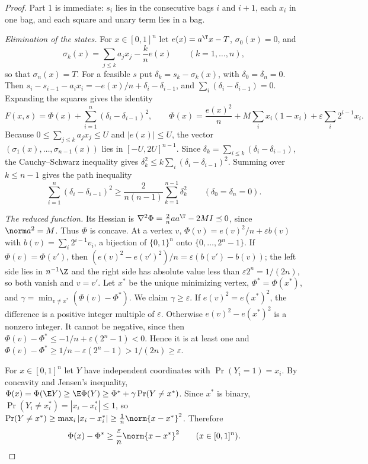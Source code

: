\begin{proof}
Part 1 is immediate: $s_i$ lies in the consecutive bags $i$ and $i+1$, each
$x_i$ in one bag, and each square and unary term lies in a bag.

\emph{Elimination of the states.} For $x\in[0,1]^n$ let
$e(x)=a^{\T}x-T$, $\sigma_0(x)=0$, and
\[
\sigma_k(x)=\sum_{j\le k}a_jx_j-\frac kne(x)\qquad(k=1,\ldots,n),
\]
so that $\sigma_n(x)=T$. For a feasible $s$ put $\delta_k=s_k-\sigma_k(x)$,
with $\delta_0=\delta_n=0$. Then
$s_i-s_{i-1}-a_ix_i=-e(x)/n+\delta_i-\delta_{i-1}$, and
$\sum_i(\delta_i-\delta_{i-1})=0$. Expanding the squares gives the identity
\begin{equation}\label{lim:eq:split}
F(x,s)=\Phi(x)+\sum_{i=1}^n(\delta_i-\delta_{i-1})^2,\qquad
\Phi(x)=\frac{e(x)^2}n+M\sum_ix_i(1-x_i)+\varepsilon\sum_i2^{i-1}x_i .
\end{equation}
Because $0\le\sum_{j\le k}a_jx_j\le U$ and $|e(x)|\le U$, the vector
$(\sigma_1(x),\ldots,\sigma_{n-1}(x))$ lies in $[-U,2U]^{n-1}$.
Since $\delta_k=\sum_{i\le k}(\delta_i-\delta_{i-1})$, the Cauchy--Schwarz
inequality gives $\delta_k^2\le k\sum_i(\delta_i-\delta_{i-1})^2$. Summing
over $k\le n-1$ gives the path inequality
\begin{equation}\label{lim:eq:path}
\sum_{i=1}^n(\delta_i-\delta_{i-1})^2\ge\frac2{n(n-1)}\sum_{k=1}^{n-1}
\delta_k^2\qquad(\delta_0=\delta_n=0).
\end{equation}

\emph{The reduced function.} Its Hessian is
$\nabla^2\Phi=\tfrac2naa^{\T}-2MI\preceq0$, since
$\norm a^2=M$. Thus $\Phi$ is concave. At a vertex $v$,
$\Phi(v)=e(v)^2/n+\varepsilon b(v)$ with $b(v)=\sum_i2^{i-1}v_i$, a
bijection of $\{0,1\}^n$ onto $\{0,\ldots,2^n-1\}$. If $\Phi(v)=\Phi(v')$,
then $(e(v)^2-e(v')^2)/n=\varepsilon(b(v')-b(v))$; the left side lies in
$n^{-1}\Z$ and the right side has absolute value less than
$\varepsilon2^n=1/(2n)$, so both vanish and $v=v'$. Let $x^*$ be the unique
minimizing vertex, $\Phi^*=\Phi(x^*)$, and
$\gamma=\min_{v\ne x^*}(\Phi(v)-\Phi^*)$. We claim $\gamma\ge\varepsilon$.
If $e(v)^2=e(x^*)^2$, the difference is a positive integer multiple of
$\varepsilon$. Otherwise $e(v)^2-e(x^*)^2$ is a nonzero integer. It cannot be
negative, since then $\Phi(v)-\Phi^*\le-1/n+\varepsilon(2^n-1)<0$. Hence it
is at least one and $\Phi(v)-\Phi^*\ge1/n-\varepsilon(2^n-1)>1/(2n)\ge
\varepsilon$.

For $x\in[0,1]^n$ let $Y$ have independent coordinates with
$\Pr(Y_i=1)=x_i$. By concavity and Jensen's inequality,
$\Phi(x)=\Phi(\E Y)\ge\E\Phi(Y)\ge\Phi^*+\gamma\Pr(Y\ne x^*)$. Since $x^*$ is
binary, $\Pr(Y_i\ne x_i^*)=|x_i-x_i^*|\le1$, so
$\Pr(Y\ne x^*)\ge\max_i|x_i-x_i^*|\ge\frac1n\norm{x-x^*}^2$. Therefore
\begin{equation}\label{lim:eq:phigrowth}
\Phi(x)-\Phi^*\ge\frac\varepsilon n\norm{x-x^*}^2\qquad(x\in[0,1]^n).
\end{equation}


\end{proof}

